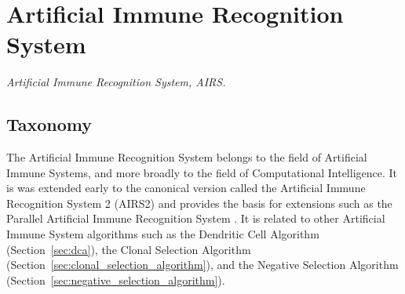 

\section{Artificial Immune Recognition System} 
\label{sec:airs}

\emph{Artificial Immune Recognition System, AIRS.}

\subsection{Taxonomy}
The Artificial Immune Recognition System belongs to the field of Artificial Immune Systems, and more broadly to the field of Computational Intelligence.
It is was extended early to the canonical version called the  Artificial Immune Recognition System 2 (AIRS2) and provides the basis for extensions such as the Parallel Artificial Immune Recognition System \cite{Watkins2004}.
It is related to other Artificial Immune System algorithms such as the Dendritic Cell Algorithm (Section~\ref{sec:dca}), the Clonal Selection Algorithm (Section~\ref{sec:clonal_selection_algorithm}), and the Negative Selection Algorithm (Section~\ref{sec:negative_selection_algorithm}).


